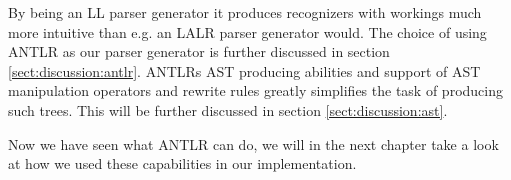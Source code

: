 By being an LL parser generator it produces recognizers with workings much more intuitive than e.g. an LALR parser generator would. The choice of using ANTLR as our parser generator is further discussed in section \ref{sect:discussion:antlr}. ANTLRs AST producing abilities and support of AST manipulation operators and rewrite rules greatly simplifies the task of producing such trees. This will be further discussed in section \ref{sect:discussion:ast}.

Now we have seen what ANTLR can do, we will in the next chapter take a look at how we used these capabilities in our implementation.
